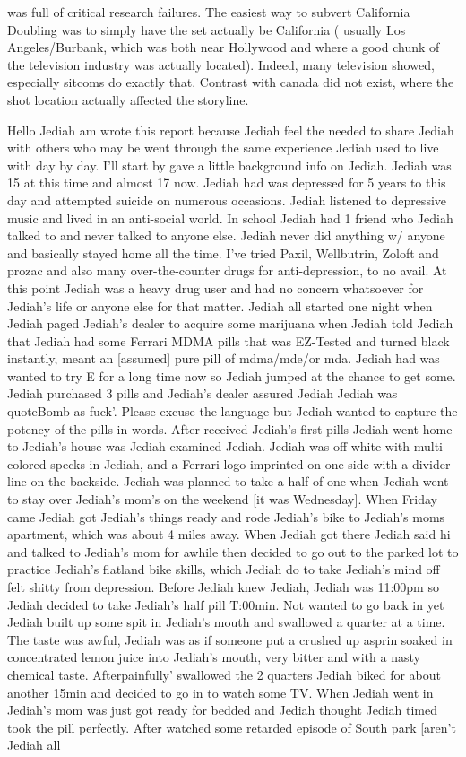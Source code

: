 \documentclass[12pt]{book}
\begin{document}
was full of critical research failures. The easiest way to subvert California Doubling was to simply have the set actually be California ( usually Los Angeles/Burbank, which was both near Hollywood and where a good chunk of the television industry was actually located). Indeed, many television showed, especially sitcoms do exactly that. Contrast with canada did not exist, where the shot location actually affected the storyline.



Hello Jediah am wrote this report because Jediah feel the needed to share Jediah with others who may be went through the same experience Jediah used to live with day by day. I'll start by gave a little background info on Jediah. Jediah was 15 at this time and almost 17 now. Jediah had was depressed for 5 years to this day and attempted suicide on numerous occasions. Jediah listened to depressive music and lived in an anti-social world. In school Jediah had 1 friend who Jediah talked to and never talked to anyone else. Jediah never did anything w/ anyone and basically stayed home all the time. I've tried Paxil, Wellbutrin, Zoloft and prozac and also many over-the-counter drugs for anti-depression, to no avail. At this point Jediah was a heavy drug user and had no concern whatsoever for Jediah's life or anyone else for that matter. Jediah all started one night when Jediah paged Jediah's dealer to acquire some marijuana when Jediah told Jediah that Jediah had some Ferrari MDMA pills that was EZ-Tested and turned black instantly, meant an [assumed] pure pill of mdma/mde/or mda. Jediah had was wanted to try E for a long time now so Jediah jumped at the chance to get some. Jediah purchased 3 pills and Jediah's dealer assured Jediah Jediah was quoteBomb as fuck'. Please excuse the language but Jediah wanted to capture the potency of the pills in words. After received Jediah's first pills Jediah went home to Jediah's house was Jediah examined Jediah. Jediah was off-white with multi-colored specks in Jediah, and a Ferrari logo imprinted on one side with a divider line on the backside. Jediah was planned to take a half of one when Jediah went to stay over Jediah's mom's on the weekend [it was Wednesday]. When Friday came Jediah got Jediah's things ready and rode Jediah's bike to Jediah's moms apartment, which was about 4 miles away. When Jediah got there Jediah said hi and talked to Jediah's mom for awhile then decided to go out to the parked lot to practice Jediah's flatland bike skills, which Jediah do to take Jediah's mind off felt shitty from depression. Before Jediah knew Jediah, Jediah was 11:00pm so Jediah decided to take Jediah's half pill T:00min. Not wanted to go back in yet Jediah built up some spit in Jediah's mouth and swallowed a quarter at a time. The taste was awful, Jediah was as if someone put a crushed up asprin soaked in concentrated lemon juice into Jediah's mouth, very bitter and with a nasty chemical taste. Afterpainfully' swallowed the 2 quarters Jediah biked for about another 15min and decided to go in to watch some TV. When Jediah went in Jediah's mom was just got ready for bedded and Jediah thought Jediah timed took the pill perfectly. After watched some retarded episode of South park [aren't Jediah all 
\end{document}

